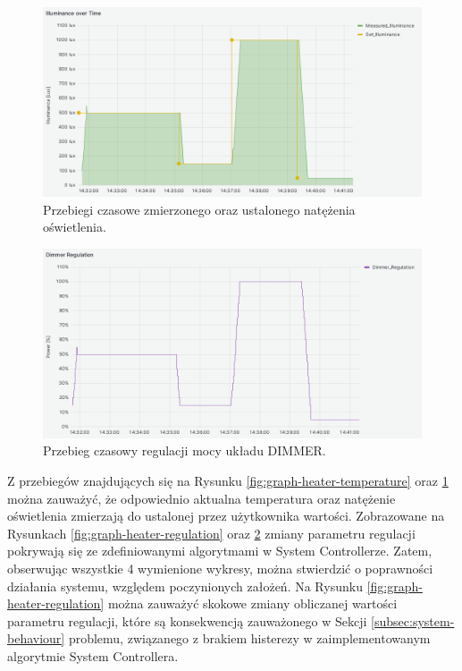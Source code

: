 \begin{figure}[H]
    \centering
    \includegraphics[width=0.8\linewidth]{graphics/grafana/illuminance-lm.png}
    \caption{Przebiegi czasowe zmierzonego oraz ustalonego natężenia oświetlenia.}
    \label{fig:graph-dimmer-illuminance}
\end{figure}

\begin{figure}[H]
    \centering
    \includegraphics[width=0.8\linewidth]{graphics/grafana/dimmer_regulation-lm.png}
    \caption{Przebieg czasowy regulacji mocy układu DIMMER.}
    \label{fig:graph-dimmer-regulation}
\end{figure}
    
    Z przebiegów znajdujących się na Rysunku \ref{fig:graph-heater-temperature} oraz \ref{fig:graph-dimmer-illuminance} można zauważyć, że odpowiednio aktualna temperatura oraz natężenie oświetlenia zmierzają do ustalonej przez użytkownika wartości. Zobrazowane na Rysunkach \ref{fig:graph-heater-regulation} oraz \ref{fig:graph-dimmer-regulation} zmiany parametru regulacji pokrywają się ze zdefiniowanymi algorytmami w System Controllerze. Zatem, obserwując wszystkie 4 wymienione wykresy, można stwierdzić o poprawności działania systemu, względem poczynionych założeń. Na Rysunku \ref{fig:graph-heater-regulation} można zauważyć skokowe zmiany obliczanej wartości parametru regulacji, które są konsekwencją zauważonego w Sekcji \ref{subsec:system-behaviour} problemu, związanego z brakiem histerezy w zaimplementowanym algorytmie System Controllera.